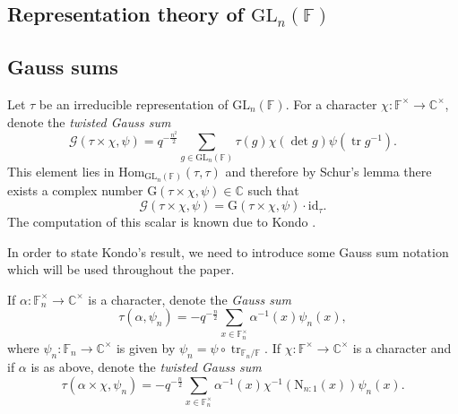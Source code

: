 \documentclass[12pt, reqno]{amsart}
\theoremstyle{definition}
\theoremstyle{definition}
\theoremstyle{definition}
\newcommand{\cComplex}{\mathbb{C}}
\newcommand{\multiplicativegroup}[1]{#1^{\times}}
\newcommand{\Hom}{\mathrm{Hom}}
\newcommand{\idmap}{\mathrm{id}}
\newcommand{\fieldCharacter}{\psi}
\newcommand{\trace}{\operatorname{tr}}
\newcommand{\GL}{\mathrm{GL}}
\newcommand{\FieldNorm}[2]{\mathrm{N}_{#1:#2}}
\newcommand{\finiteField}{\mathbb{F}}
\newcommand{\finiteFieldExtension}[1]{\finiteField_{#1}}
\newcommand{\GaussSum}[2]{\mathcal{G}\left(#1, #2\right)}
\newcommand{\GaussSumSingleCharacter}[2]{\tau\left(#1, #2\right)}
\newcommand{\GaussSumScalar}[2]{\mathrm{G}\left(#1, #2\right)}
\newcommand{\GaussSumCharacter}[3]{\tau\left(#1 \times #2, #3\right)}
\begin{document}
\subsection{Representation theory of $\GL_n\left(\finiteField\right)$}

\subsection{Gauss sums}

Let $\tau$ be an irreducible representation of $\GL_n\left(\finiteField\right)$. 
For a character $\chi \colon \multiplicativegroup{\finiteField} \to \multiplicativegroup{\cComplex}$, denote the \emph{twisted Gauss sum}
$$\GaussSum{\tau \times \chi}{\fieldCharacter} = q^{-\frac{n^2}{2}} \sum_{g \in \GL_n\left(\finiteField\right)} \tau\left(g\right) \chi\left(\det g\right) \fieldCharacter\left(\trace g^{-1}\right).$$
This element lies in $\Hom_{\GL_n\left(\finiteField\right)}\left(\tau, \tau\right)$ and therefore by Schur's lemma there exists a complex number $\GaussSumScalar{\tau \times \chi}{\fieldCharacter} \in \cComplex$ such that
$$\GaussSum{\tau \times \chi}{\fieldCharacter} = \GaussSumScalar{\tau \times \chi}{\fieldCharacter} \cdot \idmap_\tau.$$ The computation of this scalar is known due to Kondo \cite{Kondo1963}.

In order to state Kondo's result, we need to introduce some Gauss sum notation which will be used throughout the paper.

If $\alpha \colon \multiplicativegroup{\finiteFieldExtension{n}} \to \multiplicativegroup{\cComplex}$ is a character, denote the \emph{Gauss sum} $$\GaussSumSingleCharacter{\alpha}{\fieldCharacter_n} = -q^{-\frac{n}{2}}\sum_{x \in \multiplicativegroup{\finiteFieldExtension{n}}} \alpha^{-1}\left(x\right) \fieldCharacter_n\left(x\right),$$where $\fieldCharacter_n \colon \finiteFieldExtension{n} \to \multiplicativegroup{\cComplex}$ is given by $\fieldCharacter_n = \fieldCharacter \circ \trace_{\finiteFieldExtension{n} \slash \finiteField}$. If $\chi \colon \multiplicativegroup{\finiteField} \to \multiplicativegroup{\cComplex}$ is a character and if $\alpha$ is as above, denote the \emph{twisted Gauss sum}
$$\GaussSumCharacter{\alpha}{\chi}{\fieldCharacter_n} = -q^{-\frac{n}{2}}\sum_{x \in \multiplicativegroup{\finiteFieldExtension{n}}} \alpha^{-1}\left(x\right) \chi^{-1}\left( \FieldNorm{n}{1}\left(x\right)\right) \fieldCharacter_n\left(x\right).$$
\end{document}
